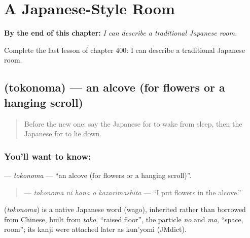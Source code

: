 
\chapter{A Japanese-Style Room}
\label{ch:ja-a-japanese-style-room}

\begin{chapteropening}
\textbf{By the end of this chapter:} \emph{I can describe a traditional Japanese room.}

Complete the last lesson of chapter 400: I can describe a traditional Japanese room.
\end{chapteropening}

\section[\texorpdfstring{\ja{とこのま} (tokonoma)}{とこのま (tokonoma)}]{ (tokonoma) — an alcove (for flowers or a hanging scroll)}

\label{lesson:JA-C400-tokonoma}



\begin{quote}
Before the new one: say the Japanese for to wake from sleep, then the Japanese for to lie down.
\end{quote}

\subsection*{You'll want to know: }
\textbf{} — \emph{tokonoma} — \textquotedblleft{}an alcove (for flowers or a hanging scroll)\textquotedblright{}.

\begin{quote}
\textbf{  } — \emph{tokonoma ni hana o kazarimashita} — \textquotedblleft{}I put flowers in the alcove.\textquotedblright{}
\end{quote}

\begin{cousinweb}
\textbf{} (\emph{tokonoma}) is a native Japanese word (wago), inherited rather than borrowed from Chinese, built from \emph{toko}, \textquotedblleft{}raised floor\textquotedblright{}, the particle \emph{no} and \emph{ma}, \textquotedblleft{}space, room\textquotedblright{}; its kanji were attached later as kun'yomi (JMdict).
\end{cousinweb}


